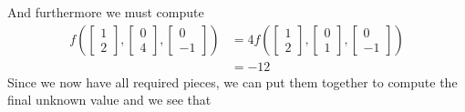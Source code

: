 \documentclass{report}
\begin{document}
And furthermore we must compute
$$
\begin{aligned}
f\left(\begin{bmatrix} 1 \\ 2 \end{bmatrix}, \begin{bmatrix} 0 \\ 4 \end{bmatrix}, \begin{bmatrix} 0 \\ -1 \end{bmatrix} \right) & =
4f\left(\begin{bmatrix} 1 \\ 2 \end{bmatrix}, \begin{bmatrix} 0 \\ 1 \end{bmatrix}, \begin{bmatrix} 0 \\ -1 \end{bmatrix} \right) \\
& = -12
\end{aligned}
$$
Since we now have all required pieces, we can put them together to compute the final unknown value and we see that
\end{document}
